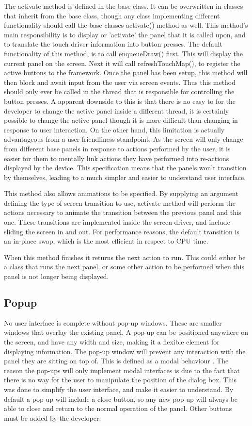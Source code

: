 The activate method is defined in the base class. It can be overwritten in classes that inherit from the base class, though any class implementing different functionality should call the base classes activate() method as well. This method's main responsibility is to display or 'activate' the panel that it is called upon, and to translate the touch driver information into button presses. The default functionality of this method, is to call enqueueDraw() first. This will display the current panel on the screen. Next it will call refreshTouchMap(), to register the active buttons to the framework. Once the panel has been setup, this method will then block and await input from the user via screen events. Thus this method should only ever be called in the thread that is responsible for controlling the button presses. A apparent downside to this is that there is no easy to for the developer to change the active panel inside a different thread, it is certainly possible to change the active panel though it is more difficult than changing in response to user interaction. On the other hand, this limitation is actually advantageous from a user friendliness standpoint. As the screen will only change from different base panels in response to actions performed by the user, it is easier for them to mentally link actions they have performed into re-actions displayed by the device. This specification means that the panels won't transition by themselves, leading to a much simpler and easier to understand user interface. 

This method also allows animations to be specified. By supplying an argument defining the type of screen transition to use, activate method will perform the actions necessary to animate the transition between the previous panel and this one. These transitions are implemented inside the screen driver, and include sliding the screen in and out. For performance reasons, the default transition is an in-place swap, which is the most efficient in respect to CPU time.

When this method finishes it returns the next action to run. This could either be a class that runs the next panel, or some other action to be performed when this panel is not longer being displayed.

\subsection{Popup}

No user interface is complete without pop-up windows. These are smaller windows that overlay the existing panel. A pop-up can be positioned anywhere on the screen, and have any width and size, making it a flexible element for displaying information. The pop-up window will prevent any interaction with the panel they are sitting on top of. This is defined as a modal behaviour \cite{modal}. The reason the pop-ups will only implement modal interfaces is due to the fact that there is no way for the user to manipulate the position of the dialog box. This was done to simplify the user interface, and make it easier to understand. By default a pop-up will include a close button, so any new pop-up will always be able to close and return to the normal operation of the panel. Other buttons must be added by the developer. 


